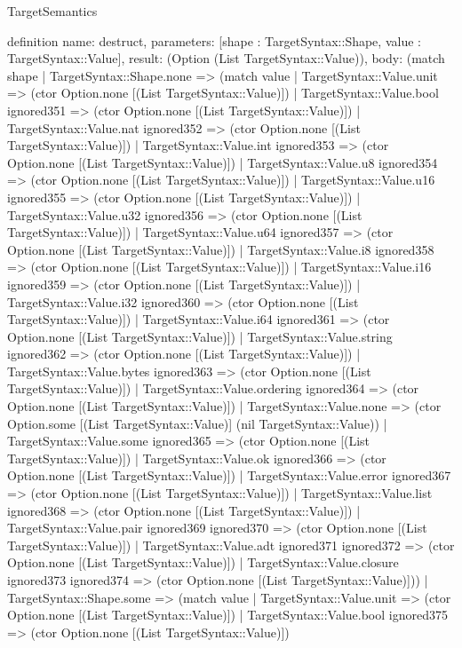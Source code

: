 \begin{lexlean}{TargetSemantics}
\begin{semanticmodule}
definition{
  name: destruct,
  parameters: [shape : TargetSyntax::Shape, value : TargetSyntax::Value],
  result: (Option (List TargetSyntax::Value)),
  body: (match shape
    | TargetSyntax::Shape.none => (match value
      | TargetSyntax::Value.unit => (ctor Option.none [(List TargetSyntax::Value)])
      | TargetSyntax::Value.bool ignored351 => (ctor Option.none [(List TargetSyntax::Value)])
      | TargetSyntax::Value.nat ignored352 => (ctor Option.none [(List TargetSyntax::Value)])
      | TargetSyntax::Value.int ignored353 => (ctor Option.none [(List TargetSyntax::Value)])
      | TargetSyntax::Value.u8 ignored354 => (ctor Option.none [(List TargetSyntax::Value)])
      | TargetSyntax::Value.u16 ignored355 => (ctor Option.none [(List TargetSyntax::Value)])
      | TargetSyntax::Value.u32 ignored356 => (ctor Option.none [(List TargetSyntax::Value)])
      | TargetSyntax::Value.u64 ignored357 => (ctor Option.none [(List TargetSyntax::Value)])
      | TargetSyntax::Value.i8 ignored358 => (ctor Option.none [(List TargetSyntax::Value)])
      | TargetSyntax::Value.i16 ignored359 => (ctor Option.none [(List TargetSyntax::Value)])
      | TargetSyntax::Value.i32 ignored360 => (ctor Option.none [(List TargetSyntax::Value)])
      | TargetSyntax::Value.i64 ignored361 => (ctor Option.none [(List TargetSyntax::Value)])
      | TargetSyntax::Value.string ignored362 => (ctor Option.none [(List TargetSyntax::Value)])
      | TargetSyntax::Value.bytes ignored363 => (ctor Option.none [(List TargetSyntax::Value)])
      | TargetSyntax::Value.ordering ignored364 => (ctor Option.none [(List TargetSyntax::Value)])
      | TargetSyntax::Value.none => (ctor Option.some [(List TargetSyntax::Value)] (nil TargetSyntax::Value))
      | TargetSyntax::Value.some ignored365 => (ctor Option.none [(List TargetSyntax::Value)])
      | TargetSyntax::Value.ok ignored366 => (ctor Option.none [(List TargetSyntax::Value)])
      | TargetSyntax::Value.error ignored367 => (ctor Option.none [(List TargetSyntax::Value)])
      | TargetSyntax::Value.list ignored368 => (ctor Option.none [(List TargetSyntax::Value)])
      | TargetSyntax::Value.pair ignored369 ignored370 => (ctor Option.none [(List TargetSyntax::Value)])
      | TargetSyntax::Value.adt ignored371 ignored372 => (ctor Option.none [(List TargetSyntax::Value)])
      | TargetSyntax::Value.closure ignored373 ignored374 => (ctor Option.none [(List TargetSyntax::Value)]))
    | TargetSyntax::Shape.some => (match value
      | TargetSyntax::Value.unit => (ctor Option.none [(List TargetSyntax::Value)])
      | TargetSyntax::Value.bool ignored375 => (ctor Option.none [(List TargetSyntax::Value)])
}
\end{semanticmodule}
\end{lexlean}
